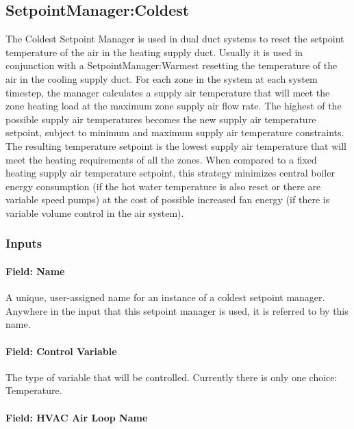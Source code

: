 \subsection{SetpointManager:Coldest}\label{setpointmanagercoldest}

The Coldest Setpoint Manager is used in dual duct systems to reset the setpoint temperature of the air in the heating supply duct. Usually it is used in conjunction with a SetpointManager:Warmest resetting the temperature of the air in the cooling supply duct. For each zone in the system at each system timestep, the manager calculates a supply air temperature that will meet the zone heating load at the maximum zone supply air flow rate. The highest of the possible supply air temperatures becomes the new supply air temperature setpoint, subject to minimum and maximum supply air temperature constraints. The resulting temperature setpoint is the lowest supply air temperature that will meet the heating requirements of all the zones. When compared to a fixed heating supply air temperature setpoint, this strategy minimizes central boiler energy consumption (if the hot water temperature is also reset or there are variable speed pumps) at the cost of possible increased fan energy (if there is variable volume control in the air system).

\subsubsection{Inputs}\label{inputs-11-017}

\paragraph{Field: Name}\label{field-name-11-013}

A unique, user-assigned name for an instance of a coldest setpoint manager. Anywhere in the input that this setpoint manager is used, it is referred to by this name.

\paragraph{Field: Control Variable}\label{field-control-variable-11}

The type of variable that will be controlled. Currently there is only one choice: Temperature.

\paragraph{Field: HVAC Air Loop Name}\label{field-hvac-air-loop-name-1}

